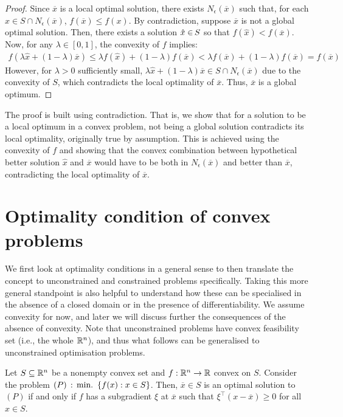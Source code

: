 \begin{proof}
Since $\overline{x}$ is a local optimal solution, there exists $N_\epsilon(\overline{x})$ such that, for each $x \in S \cap N_\epsilon(\overline{x})$, $f(\overline{x}) \leq f(x)$. By contradiction, suppose $\overline{x}$ is not a global optimal solution. Then, there exists a solution $\hat{x} \in\hspace{-1pt} S$ so that $f(\hat{x}) < f(\overline{x})$. Now, for any $\lambda \in [0,1]$, the convexity of $f$ implies:  
%
\begin{align*}
f(\lambda\hat{x} + (1-\lambda)\overline{x}) \leq \lambda f(\hat{x}) + (1-\lambda)f(\overline{x}) < \lambda f(\overline{x}) + (1-\lambda)f(\overline{x}) = f(\overline{x})
\end{align*}
%
However, for $\lambda > 0$ sufficiently small, $\lambda\hat{x} + (1-\lambda)\overline{x} \in S\cap N_\epsilon(\overline{x})$ due to the convexity of $S$, which contradicts the local optimality of $\overline{x}$. Thus, $\overline{x}$ is a global optimum. 
\end{proof}

The proof is built using contradiction. That is, we show that for a solution to be a local optimum in a convex problem, not being a global solution contradicts its local optimality, originally true by assumption. This is achieved using the convexity of $f$ and showing that the convex combination between hypothetical better solution $\hat{x}$ and $\overline{x}$ would have to be both in $N_\epsilon(\overline{x})$ and better than $\overline{x}$, contradicting the local optimality of $\overline{x}$.


\section{Optimality condition of convex problems}


We first look at optimality conditions in a general sense to then translate the concept to unconstrained and constrained problems specifically. Taking this more general standpoint is also helpful to understand how these can be specialised in the absence of a closed domain or in the presence of differentiability. We assume convexity for now, and later we will discuss further the consequences of the absence of convexity. Note that unconstrained problems have convex feasibility set (i.e., the whole $\mathbb{R}^n$), and thus what follows can be generalised to unconstrained optimisation problems.
%
\begin{theorem} \label{thm:opt_conditions}
Let $S \subseteq \mathbb{R}^n$ be a nonempty convex set and $f:\mathbb{R}^n \to \mathbb{R}$ convex on $S$. Consider the problem $(P) \,:\, \mathop{\text{min.~}}\left\{ f(x) : x \in S \right \}$.\hspace{-2pt} Then, $\overline{x}\in S$ is an optimal solution to $(P)$ if and only if $f$ has a subgradient $\xi$ at $\overline{x}$ such that $\xi^\top(x - \overline{x}) \geq 0$ for all $x \in S$. 
\end{theorem}  

